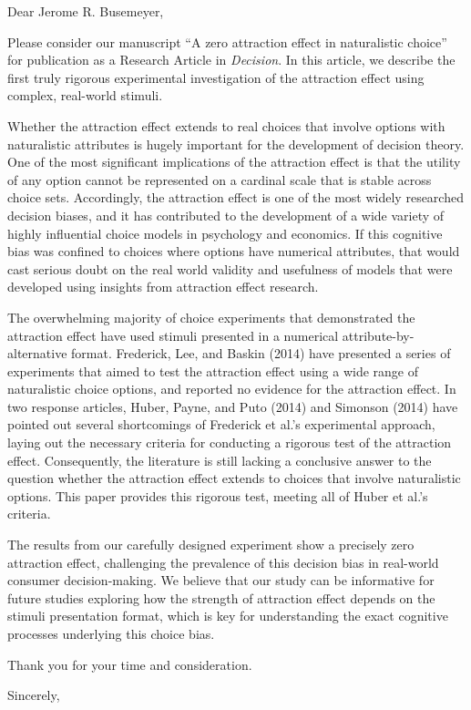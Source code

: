 \documentclass{letter}
\begin{document}
\begin{letter}
{}
\opening{Dear Jerome R. Busemeyer,} %

Please consider our manuscript ``A zero attraction effect in naturalistic choice'' for publication as a Research Article in \textit{Decision}. In this article, we describe the first truly rigorous experimental investigation of the attraction effect using complex, real-world stimuli.

Whether the attraction effect extends to real choices that involve options with naturalistic attributes is hugely important for the development of decision theory. One of the most significant implications of the attraction effect is that the utility of any option cannot be represented on a cardinal scale that is stable across choice sets. Accordingly, the attraction effect is one of the most widely researched decision biases, and it has contributed to the development of a wide variety of highly influential choice models in psychology and economics. If this cognitive bias was confined to choices where options have numerical attributes, that would cast serious doubt on the real world validity and usefulness of models that were developed using insights from attraction effect research.

The overwhelming majority of choice experiments that demonstrated the attraction effect have used stimuli presented in a numerical attribute-by-alternative format. Frederick, Lee, and Baskin (2014) have presented a series of experiments that aimed to test the attraction effect using a wide range of naturalistic choice options, and reported no evidence for the attraction effect. In two response articles, Huber, Payne, and Puto (2014) and Simonson (2014) have pointed out several shortcomings of Frederick et al.'s experimental approach, laying out the necessary criteria for conducting a rigorous test of the attraction effect. Consequently, the literature is still lacking a conclusive answer to the question whether the attraction effect extends to choices that involve naturalistic options. This paper provides this rigorous test, meeting all of Huber et al.'s criteria.

The results from our carefully designed experiment show a precisely zero attraction effect, challenging the prevalence of this decision bias in real-world consumer decision-making. We believe that our study can be informative for future studies exploring how the strength of attraction effect depends on the stimuli presentation format, which is key for understanding the exact cognitive processes underlying this choice bias.

Thank you for your time and consideration.

\closing{Sincerely,}



\end{letter}
\end{document}
